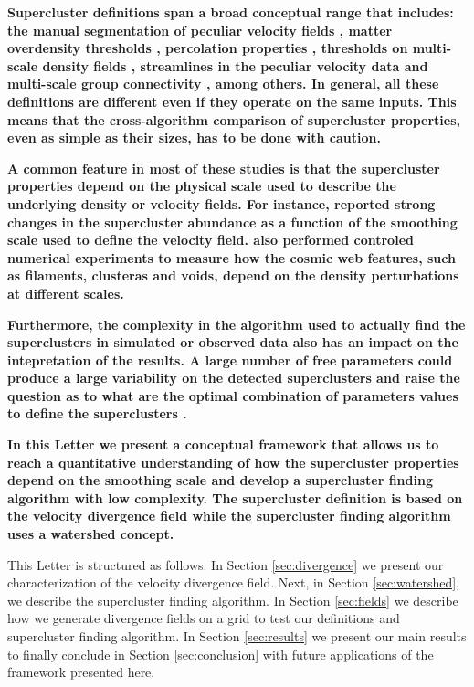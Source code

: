 \documentclass[usenatbib]{mnras}
\begin{document}
\textbf{
Supercluster definitions span a broad conceptual range that includes: the manual segmentation of peculiar velocity fields  \citep{2014Natur.513...71T}, matter overdensity thresholds \citep{2015A&A...575L..14C}, percolation properties \citep{Bagchi_2017}, thresholds on multi-scale density fields \citep{Einasto_2019}, streamlines in the peculiar velocity data \citep{Dupuy_2019} and multi-scale group connectivity \citep{2020A&A...641A.172E}, among others.
In general, all these definitions are different even if they operate on the same inputs. 
This means that the cross-algorithm comparison of supercluster properties, even as simple as their sizes, has to be done with caution.
}

\textbf{
A common feature in most of these studies is that the supercluster properties depend on the physical scale used to describe the
underlying density or velocity fields.
For instance, \cite{Dupuy_2020} reported strong changes in the supercluster abundance as a function of the smoothing scale used to define the velocity field.
\cite{2011A&A...531A.149S} also performed controled numerical experiments to measure how the cosmic web features, such as filaments, clusteras and voids, depend on the density perturbations at different scales.
}

\textbf{
Furthermore, the complexity in the algorithm used to actually find the superclusters in simulated or observed data also has an impact on the intepretation of the results.
A large number of free parameters could produce a large variability on the detected superclusters and raise the question as to what are the optimal combination of parameters values to define the superclusters \citep{Dupuy_2020}.
}

\textbf{
In this Letter we present a conceptual framework that allows us to reach a quantitative understanding of how the supercluster properties depend on the smoothing scale and develop a supercluster finding algorithm with low complexity.
The supercluster definition is based on the velocity divergence field while the supercluster finding algorithm uses a watershed concept.
}

This Letter is structured as follows.
In Section \ref{sec:divergence} we present our characterization of the velocity divergence field.
Next, in Section \ref{sec:watershed}, we describe the supercluster finding algorithm.
In Section \ref{sec:fields} we describe how we generate divergence fields on a grid to test our definitions and supercluster finding algorithm.
In Section \ref{sec:results} we present our main results to finally conclude in Section \ref{sec:conclusion} with future applications of the framework presented here.
\end{document}
